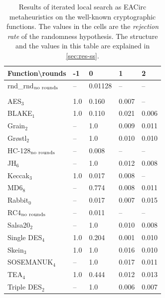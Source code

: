 \documentclass[
    digital,    %
    oneside,    %
    color,
    11pt,
    nocover,
    notable,
    nolof,
    nolot,
]{fithesis3}
\newcommand{\fd}{\cellcolor{red!25}}
\newcommand{\fn}{}
\begin{document}
\begin{table}[t]
\centering
\begin{tabular}{l|l l l l}
\textbf{\large Function\textbackslash{}rounds} & \textbf{\large -1} & \textbf{\large 0} & \textbf{\large 1} & \textbf{\large 2}\\ \hline
rnd\_rnd$_{\textnormal{no rounds}}$ & --  & \fn{}0.01128& --   & -- \\\\
AES$_{3}$        & \fd{}1.0   & \fd{}0.160 & \fn{}0.007 & \fn{}--   \\
BLAKE$_{1}$      & \fd{}1.0   & \fd{}0.110 & \fn{}0.021 & \fn{}0.006\\
Grain$_{2}$      & \fd{}--    & \fd{}1.0   & \fn{}0.009 & \fn{}0.011\\
Gr\o stl$_{2}$   & \fd{}--    & \fd{}1.0   & \fn{}0.010 & \fn{}0.010\\
HC-128$_{\textnormal{no rounds}}$& -- & \fn{}0.008 & -- & --        \\
JH$_{6}$         & \fd{}--    & \fd{}1.0   & \fn{}0.012 & \fn{}0.008\\
Keccak$_{3}$     & \fd{}1.0   & \fn{}0.017 & \fn{}0.008 & \fn{}--   \\
MD6$_{8}$        & \fd{}--    & \fd{}0.774 & \fn{}0.008 & \fn{}0.011\\
Rabbit$_{0}$     &      --    & \fn{}0.017 & \fn{}0.007 & \fn{}0.015\\
RC4$_{\textnormal{no rounds}}$& -- & \fn{}0.011 & --    & --        \\
Salsa20$_{2}$    & \fd{}--    & \fd{}1.0   & \fn{}0.010 & \fn{}0.008\\
Single DES$_{4}$ & \fd{}1.0   & \fd{}0.204 & \fn{}0.001 & \fn{}0.010\\
Skein$_{3}$      & \fd{}1.0   & \fd{}1.0   & \fn{}0.016 & \fn{}0.010\\
SOSEMANUK$_{4}$  & \fd{}--    & \fd{}1.0   & \fn{}0.017 & \fn{}0.011\\
TEA$_{4}$        & \fd{}1.0   & \fd{}0.444 & \fn{}0.012 & \fn{}0.013\\
Triple DES$_{2}$ & \fd{}--    & \fd{}1.0   & \fn{}0.006 & \fn{}0.007
\end{tabular}
\caption{Results of iterated local search as EACirc metaheuristics on the well-known cryptographic functions. The values in the cells are the \textit{rejection rate} of the randomness hypothesis. The structure and the values in this table are explained in \cref{sec:res-ss}.}
\label{table:res-usable-ils}
\end{table}
\end{document}
